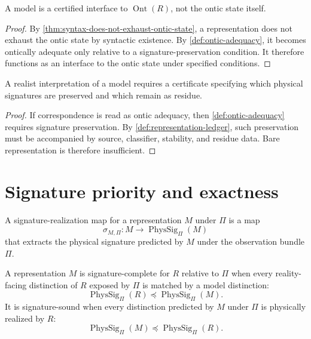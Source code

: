 \begin{corollary}
\label{cor:model-as-ontic-interface}
A model is a certified interface to $\operatorname{Ont}(R)$, not the ontic state itself.
\end{corollary}

\begin{proof}
By \autoref{thm:syntax-does-not-exhaust-ontic-state}, a representation does not exhaust the ontic state by syntactic existence. By \autoref{def:ontic-adequacy}, it becomes ontically adequate only relative to a signature-preservation condition. It therefore functions as an interface to the ontic state under specified conditions.
\end{proof}

\begin{corollary}
\label{cor:realism-requires-representation-ledgers}
A realist interpretation of a model requires a certificate specifying which physical signatures are preserved and which remain as residue.
\end{corollary}

\begin{proof}
If correspondence is read as ontic adequacy, then \autoref{def:ontic-adequacy} requires signature preservation. By \autoref{def:representation-ledger}, such preservation must be accompanied by source, classifier, stability, and residue data. Bare representation is therefore insufficient.
\end{proof}

\section{Signature priority and exactness}
\label{sec:signature-priority-exactness}

\begin{definition}
\label{def:signature-realization-map}
A signature-realization map for a representation $M$ under $\Pi$ is a map
$$
\sigma_{M,\Pi}:M\longrightarrow\operatorname{PhysSig}_{\Pi}(M)
$$
that extracts the physical signature predicted by $M$ under the observation bundle $\Pi$.
\end{definition}

\begin{definition}
\label{def:signature-completeness-soundness}
A representation $M$ is signature-complete for $R$ relative to $\Pi$ when every reality-facing distinction of $R$ exposed by $\Pi$ is matched by a model distinction:
$$
\operatorname{PhysSig}_{\Pi}(R)
\preceq
\operatorname{PhysSig}_{\Pi}(M).
$$
It is signature-sound when every distinction predicted by $M$ under $\Pi$ is physically realized by $R$:
$$
\operatorname{PhysSig}_{\Pi}(M)
\preceq
\operatorname{PhysSig}_{\Pi}(R).
$$
\end{definition}

